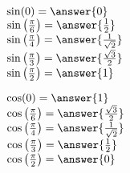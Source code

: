 \documentclass{ximera}
\author{Lee Wayand}
\begin{document}
\begin{exercise}




\begin{question}

$\sin(0) = \answer{0}$ \\


$\sin\left( \frac{\pi}{6} \right) = \answer{\frac{1}{2}}$ \\


$\sin\left( \frac{\pi}{4} \right) = \answer{\frac{1}{\sqrt{2}}}$ \\


$\sin\left( \frac{\pi}{3} \right) = \answer{\frac{\sqrt{3}}{2}}$ \\


$\sin\left( \frac{\pi}{2} \right) = \answer{1}$ \\

\end{question}







\begin{question}

$\cos(0) = \answer{1}$ \\


$\cos\left( \frac{\pi}{6} \right) = \answer{\frac{\sqrt{3}}{2}}$ \\


$\cos\left( \frac{\pi}{4} \right) = \answer{\frac{1}{\sqrt{2}}}$ \\


$\cos\left( \frac{\pi}{3} \right) = \answer{\frac{1}{2}}$ \\


$\cos\left( \frac{\pi}{2} \right) = \answer{0}$ \\

\end{question}







\end{exercise}
\end{document}
